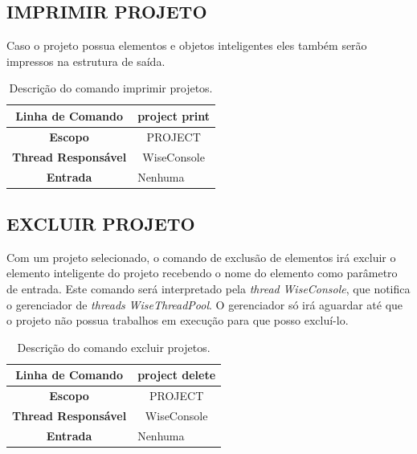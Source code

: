 \subsection{IMPRIMIR PROJETO}\label{sec:print_projects}

 Caso o projeto possua elementos e objetos inteligentes eles também serão impressos na estrutura de saída.

\begin{center}
	\begin{table}[!htbp]
		\begin{tabularx}{\textwidth}{c|X}
			\toprule
			\textbf{Linha de Comando} & \multicolumn{1}{c}{project print} \\
			\midrule
			\textbf{Escopo} & \multicolumn{1}{c}{PROJECT} \\
			\hline
			\textbf{Thread Responsável} & \multicolumn{1}{c}{WiseConsole} \\
			\hline
			\textbf{Entrada} & Nenhuma \\
			\bottomrule
		\end{tabularx}
		\caption{Descrição do comando imprimir projetos.}
		\label{tab:print_projects}
	\end{table}
\end{center}

\subsection{EXCLUIR PROJETO}\label{sec:delete_projects}

Com um projeto selecionado, o comando de exclusão de elementos irá excluir o elemento inteligente do projeto recebendo o nome do elemento como parâmetro de entrada. Este comando será interpretado pela \textit{thread} \textit{WiseConsole}, que notifica o gerenciador de \textit{threads} \textit{WiseThreadPool}. O gerenciador só irá aguardar até que o projeto não possua trabalhos em execução para que posso excluí-lo.

\begin{center}
	\begin{table}[!htbp]
		\begin{tabularx}{\textwidth}{c|X}
			\toprule
			\textbf{Linha de Comando} & \multicolumn{1}{c}{project delete} \\
			\midrule
			\textbf{Escopo} & \multicolumn{1}{c}{PROJECT} \\
			\hline
			\textbf{Thread Responsável} & \multicolumn{1}{c}{WiseConsole} \\
			\hline
			\textbf{Entrada} & Nenhuma \\
			\bottomrule
		\end{tabularx}
		\caption{Descrição do comando excluir projetos.}
		\label{tab:delete_projects}
	\end{table}
\end{center}

